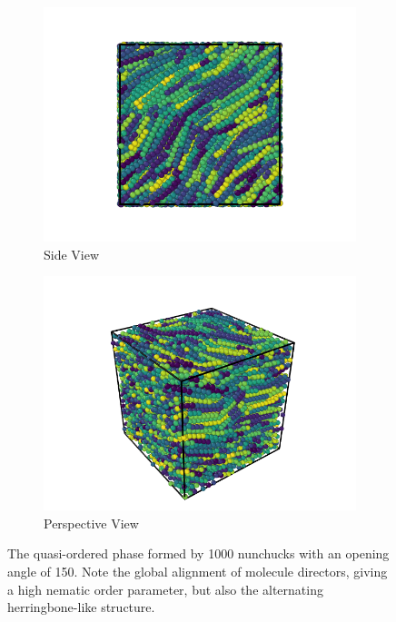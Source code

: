 \documentclass[11pt, a4paper]{article} %
\begin{document}
\begin{figure}
	\centering
	\begin{subfigure}{.5\textwidth}
		\centering
		\includegraphics[width=.9\linewidth]{Figures/nun_fa_side}
		\caption{Side View}
		\label{fig:nun_fa_side}
	\end{subfigure}%
	\begin{subfigure}{.5\textwidth}
		\centering
		\includegraphics[width=.9\linewidth]{Figures/nun_fa_perspective}
		\caption{Perspective View}
		\label{fig:nun_fa_perspective}
	\end{subfigure}
	\caption{The quasi-ordered phase formed by \num{1000} nunchucks with an opening angle of \SI{150}{\deg}. Note the global alignment of molecule directors, giving a high nematic order parameter, but also the alternating herringbone-like structure.}
	\label{fig:nun_fa_views}
\end{figure}
\end{document}
